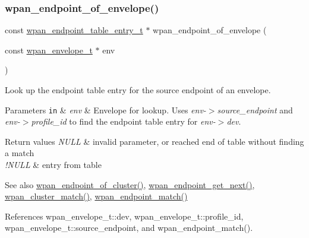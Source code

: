 \subsubsection{\texorpdfstring{wpan\+\_\+endpoint\+\_\+of\+\_\+envelope()}{wpan\_endpoint\_of\_envelope()}}
{\footnotesize\ttfamily const \hyperlink{structwpan__endpoint__table__entry__t}{wpan\+\_\+endpoint\+\_\+table\+\_\+entry\+\_\+t} $\ast$ wpan\+\_\+endpoint\+\_\+of\+\_\+envelope (\begin{DoxyParamCaption}\item[{const \hyperlink{structwpan__envelope__t}{wpan\+\_\+envelope\+\_\+t} $\ast$}]{env }\end{DoxyParamCaption})}



Look up the endpoint table entry for the source endpoint of an envelope. 


\begin{DoxyParams}[1]{Parameters}
\mbox{\tt in}  & {\em env} & Envelope for lookup. Uses {\itshape env-\/$>$source\+\_\+endpoint} and {\itshape env-\/$>$profile\+\_\+id} to find the endpoint table entry for {\itshape env-\/$>$dev}.\\
\hline
\end{DoxyParams}

\begin{DoxyRetVals}{Return values}
{\em N\+U\+LL} & invalid parameter, or reached end of table without finding a match \\
\hline
{\em !\+N\+U\+LL} & entry from table\\
\hline
\end{DoxyRetVals}
\begin{DoxySeeAlso}{See also}
\hyperlink{group__wpan__aps_ga2cc975231963e0eb75c449c11b1d95de}{wpan\+\_\+endpoint\+\_\+of\+\_\+cluster()}, \hyperlink{group__wpan__aps_gaca3b72047ea4e156ce9a977c13624b5c}{wpan\+\_\+endpoint\+\_\+get\+\_\+next()}, \hyperlink{group__wpan__aps_ga1c725384b21faf5953683d7b028c7be3}{wpan\+\_\+cluster\+\_\+match()}, \hyperlink{group__wpan__aps_ga0a88c1b17d1f9a42a53668b14f15e205}{wpan\+\_\+endpoint\+\_\+match()} 
\end{DoxySeeAlso}


References wpan\+\_\+envelope\+\_\+t\+::dev, wpan\+\_\+envelope\+\_\+t\+::profile\+\_\+id, wpan\+\_\+envelope\+\_\+t\+::source\+\_\+endpoint, and wpan\+\_\+endpoint\+\_\+match().

\mbox{\label{group__wpan__aps_ga95e2bb4e4c546191c059f54179064fc3}} 
